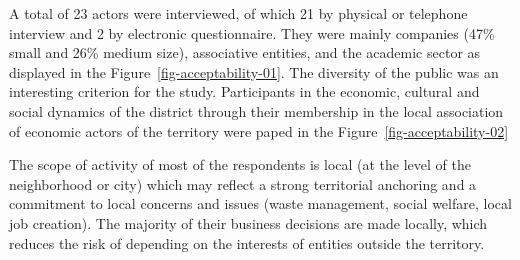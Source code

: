 \documentclass[
  11pt,
]{article}
\begin{document}
A total of 23 actors were interviewed, of which 21 by physical or
telephone interview and 2 by electronic questionnaire. They were mainly
companies (47\% small and 26\% medium size), associative entities, and
the academic sector as displayed in the
Figure~\ref{fig-acceptability-01}. The diversity of the public was an
interesting criterion for the study. Participants in the economic,
cultural and social dynamics of the district through their membership in
the local association of economic actors of the territory were paped in
the Figure~\ref{fig-acceptability-02}

The scope of activity of most of the respondents is local (at the level
of the neighborhood or city) which may reflect a strong territorial
anchoring and a commitment to local concerns and issues (waste
management, social welfare, local job creation). The majority of their
business decisions are made locally, which reduces the risk of depending
on the interests of entities outside the territory.
\end{document}
